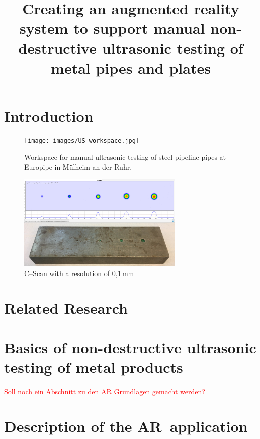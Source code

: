 \documentclass{VRARWorkshop}
\title{Creating an augmented reality system to support manual non-destructive ultrasonic testing of metal pipes and plates}
\begin{document}
\section{Introduction}

\begin{figure}[h!]
    \begin{center}
        \texttt{[image: images/US-workspace.jpg]}
        \caption{\label{fig:europipe} Workspace for manual ultrasonic-testing of steel pipeline pipes at Europipe in Mülheim an der Ruhr.}
    \end{center}
\end{figure}

\begin{figure}[h!]
    \begin{center}
        \includegraphics[width=79mm]{images/CScan.jpg}
        \caption{\label{fig:cScan} C--Scan with a resolution of 0,1\,mm}
    \end{center}
\end{figure}

\section{Related Research}
\cite{ARPat15}
\cite{ARClean}
\cite{schwerdtfeger_using_2008}
\cite{fadzil_design_2015}
\cite{walter_non-contact_2007}

\section{Basics of non-destructive ultrasonic testing of metal products}
\cite{deutsch_zfp_2010}
\cite{moles_introduction_2004}
\cite{olympus_Grundlagen}

\textcolor{red}{Soll noch ein Abschnitt zu den AR Grundlagen gemacht werden?}

\section{Description of the AR--application}
\end{document}
